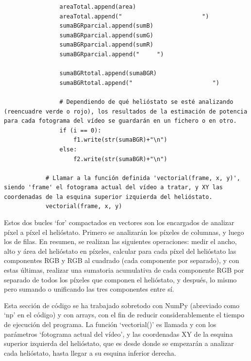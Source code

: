 \begin{lstlisting}
                areaTotal.append(area)
                areaTotal.append("                       ")
                sumaBGRparcial.append(sumB)
                sumaBGRparcial.append(sumG)
                sumaBGRparcial.append(sumR)
                sumaBGRparcial.append("     ")
                
                sumaBGRtotal.append(sumaBGR)
                sumaBGRtotal.append("                       ")
                
                # Dependiendo de qué helióstato se esté analizando (reencuadre verde o rojo), los resultados de la estimación de potencia para cada fotograma del vídeo se guardarán en un fichero o en otro.
                if (i == 0):
                    f1.write(str(sumaBGR)+"\n")  
                else:
                    f2.write(str(sumaBGR)+"\n")

            # Llamar a la función definida 'vectorial(frame, x, y)', siendo 'frame' el fotograma actual del vídeo a tratar, y XY las coordenadas de la esquina superior izquierda del helióstato.
            vectorial(frame, x, y)
\end{lstlisting}
        
Estos dos bucles ‘for’ compactados en vectores son los encargados de analizar píxel a píxel el helióstato. Primero se analizarán los píxeles de columnas, y luego los de filas. En resumen, se realizan las siguientes operaciones: medir el ancho, alto y área del helióstato en píxeles, calcular para cada píxel del helióstato las componentes RGB y RGB al cuadrado (cada componente por separado), y con estas últimas, realizar una sumatoria acumulativa de cada componente RGB por separado de todos los píxeles que componen el helióstato, y después, lo mismo pero sumando o unificando las tres componentes entre sí.

Esta sección de código se ha trabajado sobretodo con NumPy (abreviado como ‘np’ en el código) y con arrays, con el fin de reducir considerablemente el tiempo de ejecución del programa. La función ‘vectorial()’ es llamada y con los parámetros ‘fotograma actual del vídeo’, y las coordenadas XY de la esquina superior izquierda del helióstato, que es desde donde se empezarán a analizar cada helióstato, hasta llegar a su esquina inferior derecha.

